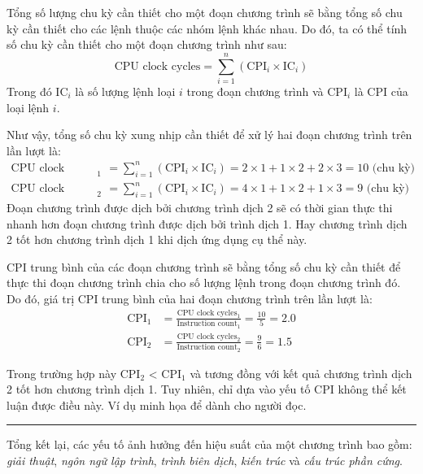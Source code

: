 \begin{answ}
Tổng số lượng chu kỳ cần thiết cho một đoạn chương trình sẽ bằng tổng số chu kỳ cần thiết cho các lệnh thuộc các nhóm lệnh khác nhau. Do đó, ta có thể tính số chu kỳ cần thiết cho một đoạn chương trình như sau:
\begin{equation*}
\text{CPU clock cycles} = \sum_{i = 1}^{n} (\text{CPI}_i \times \text{IC}_i)
\end{equation*}
Trong đó $\text{IC}_i$ là số lượng lệnh loại $i$ trong đoạn chương trình và $\text{CPI}_i$ là CPI của loại lệnh $i$.

Như vậy, tổng số chu kỳ xung nhịp cần thiết để xử lý hai đoạn chương trình trên lần lượt là:
\begin{align*}
\text{CPU clock cycles}_1 &= \sum_{i = 1}^{n} (\text{CPI}_i \times \text{IC}_i) = 2 \times 1 + 1 \times 2 + 2 \times 3 = \text{10 (chu kỳ)}\\
\text{CPU clock cycles}_2 &= \sum_{i = 1}^{n} (\text{CPI}_i \times \text{IC}_i) = 4 \times 1 + 1 \times 2 + 1 \times 3 = \text{9 (chu kỳ)}
\end{align*}
Đoạn chương trình được dịch bởi chương trình dịch 2 sẽ có thời gian thực thi nhanh hơn đoạn chương trình được dịch bởi trình dịch 1. Hay chương trình dịch 2 tốt hơn chương trình dịch 1 khi dịch ứng dụng cụ thể này.

CPI trung bình của các đoạn chương trình sẽ bằng tổng số chu kỳ cần thiết để thực thi đoạn chương trình chia cho số lượng lệnh trong đoạn chương trình đó. Do đó, giá trị CPI trung bình của hai đoạn chương trình trên lần lượt là:
\begin{align*}
\text{CPI}_1 &= \frac{\text{CPU clock cycles}_1}{\text{Instruction count}_1} = \frac{10}{5} = 2.0\\
\text{CPI}_2 &= \frac{\text{CPU clock cycles}_2}{\text{Instruction count}_2} = \frac{9}{6} = 1.5
\end{align*}

Trong trường hợp này CPI$_2$ < CPI$_1$ và tương đồng với kết quả chương trình dịch 2 tốt hơn chương trình dịch 1. Tuy nhiên, chỉ dựa vào yếu tố CPI không thể kết luận được điều này. Ví dụ minh họa để dành cho người đọc.\\
\hrule
\end{answ}

Tổng kết lại, các yếu tố ảnh hưởng đến hiệu suất của một chương trình bao gồm: \emph{giải thuật}, \emph{ngôn ngữ lập trình}, \emph{trình biên dịch}, \emph{kiến trúc} và \emph{cấu trúc phần cứng}.

